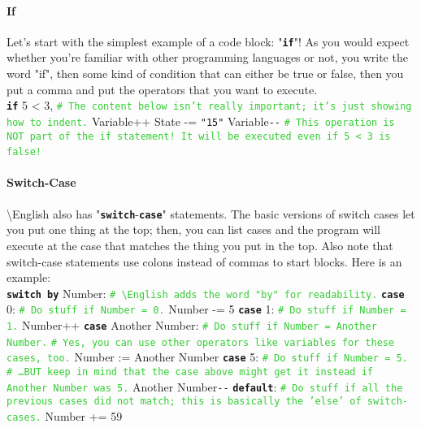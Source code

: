 \documentclass{article}
\newcommand{\English}{\textbackslash{}English}				%
\newcommand{\codecomment}[1]{\texttt{\textcolor{LimeGreen}{#1}}}
\newcommand{\commentline}[1]{\codecomment{\# #1}}
\newcommand{\common}[1]{\texttt{\textcolor{Mulberry}{\textbf{#1}}}}
\newcommand{\codestring}[1]{\texttt{\textcolor{NavyBlue}{"#1"}}}
\newenvironment{code}[0]
{\ttfamily{}				%
\setlength\parindent{0cm}	%
~\\}
{\setlength\parindent{1cm}
~\\}
\begin{document}
\paragraph{If}
\indent Let's start with the simplest example of a code block: "\common{if}"! As you would expect whether you're familiar with other programming languages or not, you write the word "if", then some kind of condition that can either be true or false, then you put a comma and put the operators that you want to execute.
\begin{code}
\common{if} 5 < 3,
\qquad{}\commentline{The content below isn't really important; it's just showing how to indent.}
\qquad{}Variable++
\qquad{}State -= \codestring{15}
Variable\verb+--+ \commentline{This operation is NOT part of the if statement! It will be executed even if 5 < 3 is false!}
\end{code}

\paragraph{Switch-Case}
\indent \English{} also has "\common{switch}-\common{case}" statements. The basic versions of switch cases let you put one thing at the top; then, you can list cases and the program will execute at the case that matches the thing you put in the top. Also note that switch-case statements use colons instead of commas to start blocks. Here is an example:
\begin{code}
\common{switch by} Number: \commentline{\English{} adds the word "by" for readability.}
\common{case} 0:
\qquad\commentline{Do stuff if Number = 0.}
\qquad{}Number -= 5
\common{case} 1:
\qquad\commentline{Do stuff if Number = 1.}
\qquad{}Number++
\common{case} Another Number:
\qquad\commentline{Do stuff if Number = Another Number.}
\qquad\commentline{Yes, you can use other operators like variables for these cases, too.}
\qquad{}Number := Another Number
\common{case} 5:
\qquad\commentline{Do stuff if Number = 5.}
\qquad\commentline{\ldots{}BUT keep in mind that the case above might get it instead if Another Number was 5.}
\qquad{}Another Number\verb+--+
\common{default}:
\qquad\commentline{Do stuff if all the previous cases did not match; this is basically the 'else' of switch-cases.}
\qquad{}Number += 59
\end{code}
\end{document}
